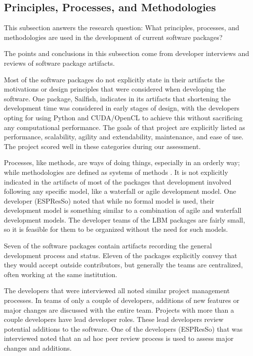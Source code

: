 \documentclass[final, 3p, times, authoryear]{elsarticle}
\begin{document}
\subsection{Principles, Processes, and Methodologies} \label{prinprocmeth}

This subsection answers the research question: What principles, processes, and
methodologies are used in the development of current software packages?

The points and conclusions in this subsection come from developer interviews and
reviews of software package artifacts.

Most of the software packages do not explicitly state in their artifacts the
motivations or design principles that were considered when developing the
software. One package, Sailfish, indicates in its artifacts that shortening the
development time was considered in early stages of design, with the developers
opting for using Python and CUDA/OpenCL to achieve this without sacrificing any
computational performance. The goals of that project are explicitly listed as
performance, scalability, agility and extendability, maintenance, and ease of
use. The project scored well in these categories during our assessment.

Processes, like methods, are ways of doing things, especially in an orderly way;
while methodologies are defined as systems of methods
\citep{ghezzi1991fundamentals}. It is not explicitly indicated in the artifacts
of most of the packages that development involved following any specific model,
like a waterfall or agile development model. One developer (ESPResSo) noted that
while no formal model is used, their development model is something similar to a
combination of agile and waterfall development models. The developer teams of
the LBM packages are fairly small, so it is feasible for them to be organized
without the need for such models. 

Seven of the software packages contain artifacts recording the general
development process and status. Eleven of the packages explicitly convey that they would accept outside contributors, but generally the teams are centralized, often working at the same institution. 

The developers that were interviewed all noted similar project management
processes. In teams of only a couple of developers, additions of new features or
major changes are discussed with the entire team. Projects with more than a
couple developers have lead developer roles. These lead developers review
potential additions to the software. One of the developers (ESPResSo) that was
interviewed noted that an ad hoc peer review process is used to assess major
changes and additions.
\end{document}
